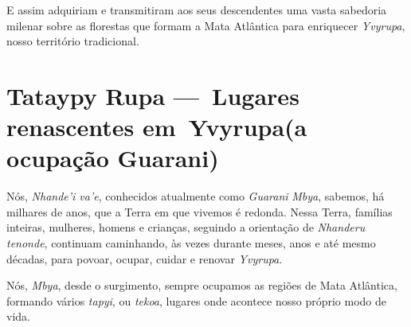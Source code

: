 E assim adquiriam e transmitiram aos seus descendentes uma vasta
sabedoria milenar sobre as florestas que formam a Mata Atlântica para
enriquecer \emph{Yvyrupa}, nosso território tradicional.





 
\ifodd\thepage\paginabranca\else\relax\fi

\part[Lugares renascentes em Yvyrupa]{Tataypy Rupa — Lugares renascentes em Yvyrupa\break (a ocupação Guarani)}


\mbox{}\vfill
Nós, \emph{Nhande'i va'e}, conhecidos atualmente como \emph{Guarani}
\emph{Mbya}, sabemos, há milhares de anos, que a Terra em que vivemos é
redonda. Nessa Terra, famílias inteiras, mulheres, homens e crianças,
seguindo a orientação de \emph{Nhanderu tenonde}, continuam caminhando,
às vezes durante meses, anos e até mesmo décadas, para povoar, ocupar,
cuidar e renovar \emph{Yvyrupa}.

Nós, \emph{Mbya}, desde o surgimento, sempre ocupamos as regiões de Mata
Atlântica, formando vários \emph{tapyi}, ou \emph{tekoa}, lugares onde
acontece nosso próprio modo de vida.

 

